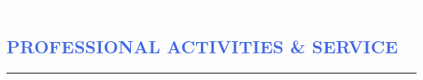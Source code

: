 \documentclass[11pt]{article}
\begin{document}

\newpage
\textcolor{White}{.}
\vspace{-1.5cm}
\vspace{-0.35cm}
\textcolor{RoyalBlue}{\section{\large PROFESSIONAL ACTIVITIES \& SERVICE}
\vspace{-0.35cm}\hrule}
\vspace{0.4cm}
\end{document}
